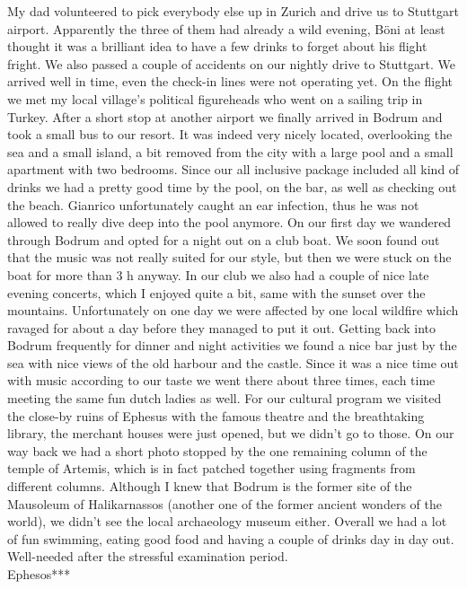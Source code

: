 My dad volunteered to pick everybody else up in Zurich and drive us to Stuttgart airport. Apparently the three of them had already a wild evening, B\"oni at least thought it was a brilliant idea to have a few drinks to forget about his flight fright. We also passed a couple of accidents on our nightly drive to Stuttgart. We arrived well in time, even the check-in lines were not operating yet. On the flight we met my local village's political figureheads who went on a sailing trip in Turkey. After a short stop at another airport we finally arrived in Bodrum and took a small bus to our resort. It was indeed very nicely located, overlooking the sea and a small island, a bit removed from the city with a large pool and a small apartment with two bedrooms. Since our all inclusive package included all kind of drinks we had a pretty good time by the pool, on the bar, as well as checking out the beach. Gianrico unfortunately caught an ear infection, thus he was not allowed to really dive deep into the pool anymore. On our first day we wandered through Bodrum and opted for a night out on a club boat. We soon found out that the music was not really suited for our style, but then we were stuck on the boat for more than 3 h anyway. In our club we also had a couple of nice late evening concerts, which I enjoyed quite a bit, same with the sunset over the mountains. Unfortunately on one day we were affected by one local wildfire which ravaged for about a day before they managed to put it out. Getting back into Bodrum frequently for dinner and night activities we found a nice bar just by the sea with nice views of the old harbour and the castle. Since it was a nice time out with music according to our taste we went there about three times, each time meeting the same fun dutch ladies as well. For our cultural program we visited the close-by ruins of Ephesus with the famous theatre and the breathtaking library, the merchant houses were just opened, but we didn't go to those. On our way back we had a short photo stopped by the one remaining column of the temple of Artemis, which is in fact patched together using fragments from different columns. Although I knew that Bodrum is the former site of the Mausoleum of Halikarnassos (another one of the former ancient wonders of the world), we didn't see the local archaeology museum either. Overall we had a lot of fun swimming, eating good food and having a couple of drinks day in day out. Well-needed after the stressful examination period.\\

Ephesos***\\